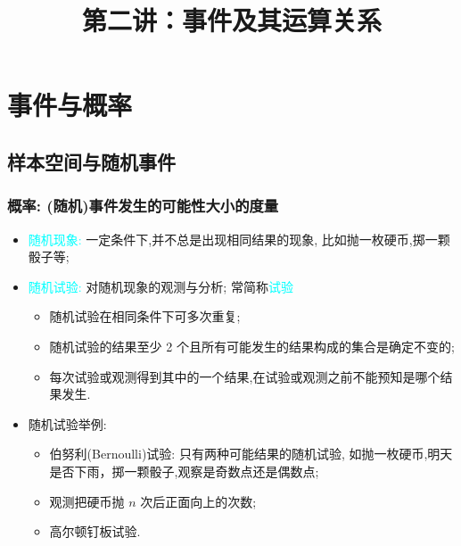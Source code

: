 \documentclass[Prob-All.tex]{subfiles}
\begin{document}
\title[概率论]{第二讲：事件及其运算关系}
\date{}


{ 
  \begin{frame}
    \titlepage
  \end{frame}
}

\section{事件与概率}







\subsection{样本空间与随机事件}
\begin{frame}
  \frametitle{概率: (随机)事件发生的可能性大小的度量}
  \begin{itemize}[<+-|alert@+>]
  \item \textcolor{cyan}{随机现象:} 一定条件下,并不总是出现相同结果的现象, 比如抛一枚硬币,掷一颗骰子等;
  \item \textcolor{cyan}{随机试验:} 对随机现象的观测与分析; 常简称\textcolor{cyan}{试验}
  \begin{itemize}[<+-|alert@+>]
    \item 随机试验在相同条件下可多次重复;
    \item 随机试验的结果至少 2 个且所有可能发生的结果构成的集合是确定不变的;

    \item 每次试验或观测得到其中的一个结果,在试验或观测之前不能预知是哪个结果发生.


    \end{itemize}
    \item 随机试验举例:
    \begin{itemize}[<+-|alert@+>]
      \item 伯努利(Bernoulli)试验: 只有两种可能结果的随机试验, 如抛一枚硬币,明天是否下雨，掷一颗骰子,观察是奇数点还是偶数点;
      \item 观测把硬币抛 $n$ 次后正面向上的次数;
      \item 高尔顿钉板试验.
    \end{itemize}
  \end{itemize}
\end{frame}
\end{document}
